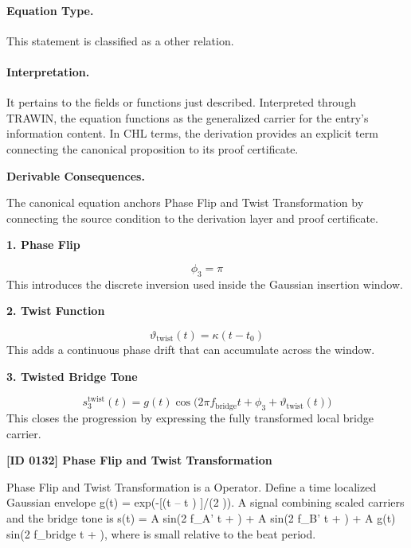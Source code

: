 \paragraph{Equation Type.}
This statement is classified as a other relation.

\paragraph{Interpretation.}
It pertains to the fields or functions just described. Interpreted through TRAWIN, the equation functions as the generalized carrier for the entry’s information content. In CHL terms, the derivation provides an explicit term connecting the canonical proposition to its proof certificate.

\par\vspace{0.35em}
\noindent\textbf{Derivable Consequences.}\quad
\begingroup
\footnotesize
\raggedright
The canonical equation anchors Phase Flip and Twist Transformation by connecting the source condition to the derivation layer and proof certificate.
\par\endgroup

\noindent\textbf{1. Phase Flip}\par
\[
\phi_3=\pi
\]
\noindent This introduces the discrete inversion used inside the Gaussian insertion window.\par
\noindent\textbf{2. Twist Function}\par
\[
\vartheta_{\mathrm{twist}}(t)=\kappa (t-t_0)
\]
\noindent This adds a continuous phase drift that can accumulate across the window.\par
\noindent\textbf{3. Twisted Bridge Tone}\par
\[
s_3^{\mathrm{twist}}(t)=g(t)\cos\!\bigl(2\pi f_{\mathrm{bridge}} t+\phi_3+\vartheta_{\mathrm{twist}}(t)\bigr)
\]
\noindent This closes the progression by expressing the fully transformed local bridge carrier.\par

\clearpage
\noindent\textbf{[ID 0132] Phase Flip and Twist Transformation}\par
\vspace{0.35em}
\begingroup\small
{}
Phase Flip and Twist Transformation is a Operator. Define a time localized Gaussian envelope g(t) = exp(-[(t -- t ) ]/(2   )). A signal combining scaled carriers and the bridge tone is s(t) = A  sin(2  f\_A' t +   ) + A  sin(2  f\_B' t +   ) + A  g(t) sin(2  f\_bridge t +   ), where   is small relative to the beat period.

